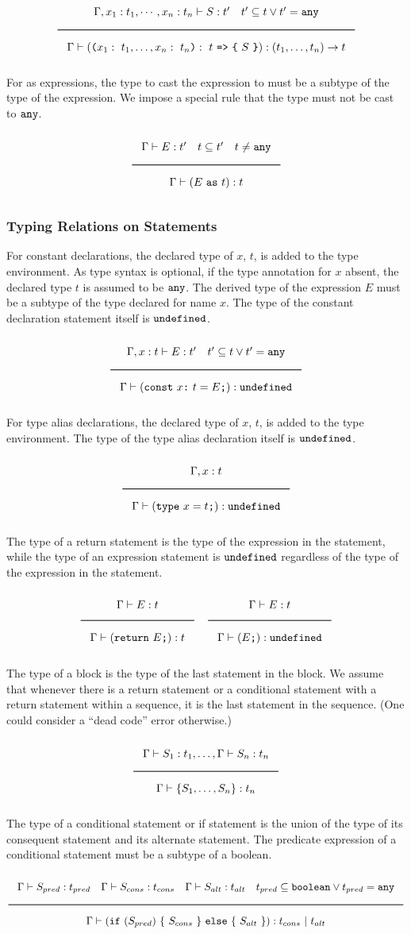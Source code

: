 \noindent
\[
  \Rule{\Gamma, x_1 : t_1, \cdots, x_n : t_n \vdash S : t' \quad t' \subseteq t \vee t' = \Any}{
    \Gamma \vdash ( \Lp  x_1:\ t_1, \ldots, x_n:\ t_n \Rp :\ t\ \texttt{=>}\ \Lc\ S\ \Rc) : (t_1, \ldots, t_n) \rightarrow t}  
\]
\noindent

For as expressions, the type to cast the expression to must be a subtype of the type of the expression.
We impose a special rule that the type must not be cast to $\texttt{any}$.

\noindent
\[
  \Rule{\Gamma \vdash E : t' \quad t \subseteq t' \quad t \neq \Any}{\Gamma \vdash (E\ \texttt{as}\ t) : t}  
\]
\noindent

\subsubsection{Typing Relations on Statements}

For constant declarations, the declared type of $x$, $t$, is added to the type environment.
As type syntax is optional, if the type annotation for $x$ absent, the declared type $t$ is assumed to be $\texttt{any}$.
The derived type of the expression $E$ must be a subtype of the type declared for name $x$.
The type of the constant declaration statement itself is $\texttt{undefined}$.

\[
  \Rule{\Gamma, x : t \vdash E : t' \quad t' \subseteq t \vee t' = \Any}{
    \Gamma \vdash (\texttt{const}\ x \texttt{:}\ t = E\texttt{;}) : \Undefined}
\]

For type alias declarations, the declared type of $x$, $t$, is added to the type environment.
The type of the type alias declaration itself is $\texttt{undefined}$.

\[
  \Rule{\Gamma, x : t}{\Gamma \vdash (\texttt{type}\ x = t\texttt{;}) : \Undefined}
\]

The type of a return statement is the type of the expression in the statement,
while the type of an expression statement is $\texttt{undefined}$ regardless of the type of the expression in the statement.

\[
  \Rule{\Gamma \vdash E : t}{\Gamma \vdash (\texttt{return}\ E\texttt{;}) : t}
  \quad
  \Rule{\Gamma \vdash E : t}{\Gamma \vdash (E\texttt{;}) : \Undefined}
\]

The type of a block is the type of the last statement in the block. We assume that
whenever there is a return statement or a conditional statement with a return statement within a
sequence, it is the last statement in the sequence.
(One could consider a ``dead code'' error otherwise.)

\[
  \Rule{\Gamma \vdash S_1 : t_1, \ldots, \Gamma \vdash S_n : t_n}{\Gamma \vdash \{S_1, \ldots, S_n\} : t_n}
\]

The type of a conditional statement or if statement is the union of the type of its consequent statement and its alternate statement.
The predicate expression of a conditional statement must be a subtype of a boolean.

\[
  \Rule{\Gamma \vdash S_{pred} : t_{pred} \quad \Gamma \vdash S_{cons} : t_{cons} \quad \Gamma \vdash S_{alt} : t_{alt}
    \quad t_{pred} \subseteq \Bool \vee t_{pred} = \Any}{\Gamma \vdash (\texttt{if}\ (S_{pred})\ \{\ S_{cons}\ \}\
    \texttt{else}\ \{\ S_{alt}\ \}) : t_{cons}\ |\ t_{alt}}
\]
